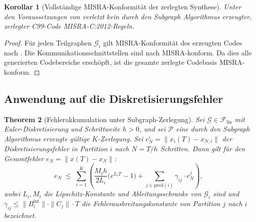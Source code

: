 ﻿\documentclass[12pt,a4paper]{article}
\newtheorem{theorem}{Theorem}[section]
\newtheorem{korollar}[theorem]{Korollar}
\theoremstyle{definition}
\begin{document}
\begin{korollar}[Vollständige MISRA-Konformität der zerlegten Synthese]
\label{kor:misra-subgraph}
Unter den Voraussetzungen von  verletzt kein
durch den Subgraph Algorithmus erzeugter, zerlegter C99-Code
MISRA-C:2012-Regeln.
\end{korollar}

\begin{proof}
Für jeden Teilgraphen $\mathcal{G}_i$ gilt MISRA-Konformität des erzeugten
Codes nach . Die Kommunikationsschnittstellen
sind nach  MISRA-konform. Da dies alle generierten
Codebereiche erschöpft, ist die gesamte zerlegte Codebasis MISRA-konform.
\end{proof}

\subsection{Anwendung auf die Diskretisierungsfehler}
\label{subsec:subgraph-error}

\begin{theorem}[Fehlerakkumulation unter Subgraph-Zerlegung]
\label{thm:subgraph-error}
Sei $\mathcal{G} \in \mathcal{F}_{\mathrm{lin}}$ mit Euler-Diskretisierung
und Schrittweite $h > 0$, und sei $\mathcal{P}$ eine durch den Subgraph
Algorithmus erzeugte gültige $K$-Zerlegung. Sei
$e_N^i = \|x_i(T) - x_{N,i}\|$ der Diskretisierungsfehler in Partition $i$
nach $N = T/h$ Schritten. Dann gilt für den Gesamtfehler
$e_N = \|x(T) - x_N\|$:
\[
  e_N
  \;\leq\;
  \sum_{i=1}^K
  \left(
    \frac{M_i h}{2 L_i} \bigl(e^{L_i T} - 1\bigr)
    + \sum_{j \in \mathrm{pred}(i)} \gamma_{ij} \cdot e_N^j
  \right),
\]
wobei $L_i, M_i$ die Lipschitz-Konstante und Ableitungsschranke von
$\mathcal{G}_i$ sind und $\gamma_{ij} \leq \|B_i^{\mathrm{int}}\| \cdot
\|C_j\| \cdot T$ die Fehlerausbreitungskonstante von Partition $j$ nach
$i$ bezeichnet.
\end{theorem}
\end{document}
